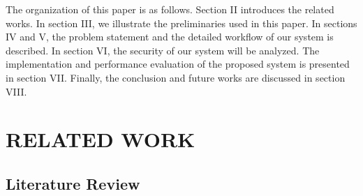 \documentclass[journal]{IEEEtran}
\begin{document}
    The organization of this paper is as follows. Section II introduces the related works. In section III, we illustrate the preliminaries used in this paper. In sections IV and V, the problem statement and the detailed workflow of our system is described. In section VI, the security of our system will be analyzed. The implementation and performance evaluation of the proposed system is presented in section VII. Finally, the conclusion and future works are discussed in section VIII.


	\section{RELATED WORK}
	\label{chap:related_work}
	
	\subsection{Literature Review}
	
\end{document}
